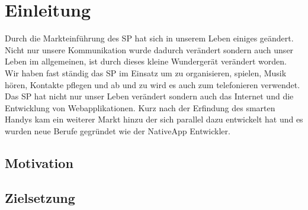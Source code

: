 \chapter{Einleitung}\label{chap:Einleitung}
\thispagestyle{standard}
\pagestyle{standard}
\renewcommand{\footrulewidth}{0.4pt}

Durch die Markteinführung des \acl{SP} hat sich in unserem Leben einiges geändert. Nicht nur unsere Kommunikation wurde dadurch verändert sondern auch unser Leben im allgemeinen, ist durch dieses kleine Wundergerät verändert worden.
Wir haben fast ständig das \acs{SP} im Einsatz um zu organisieren, spielen, Musik hören, Kontakte pflegen und ab und zu wird es auch zum telefonieren verwendet.
Das \acl{SP} hat nicht nur unser Leben verändert sondern auch das Internet und die Entwicklung von Webapplikationen. Kurz nach der Erfindung des smarten Handys kam ein weiterer Markt hinzu der sich parallel dazu entwickelt hat und es wurden neue Berufe gegründet wie der NativeApp Entwickler.



\section{Motivation} \label{sub:Motivation}





\newpage
\section{Zielsetzung}\label{sub:Zielsetzung}









